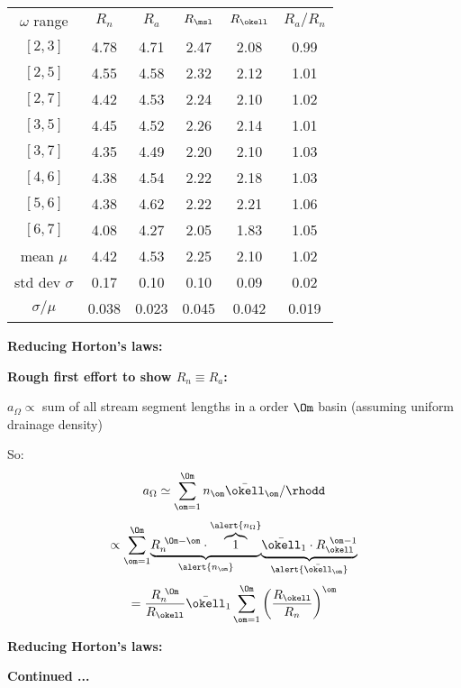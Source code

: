 \begin{frame}[label=]
\begin{frame}[label=]
\begin{frame}[label=]
\begin{frame}[label=]
\begin{frame}[label=]
\begin{frame}[label=]
\begin{frame}[label=]
\begin{frame}[label=]
\begin{frame}[label=]
\begin{frame}[label=]
\begin{frame}[label=]
\begin{frame}[label=]
\begin{frame}[label=]
\begin{frame}[label=]
\begin{frame}[label=]
   \begin{tabular}{cccccc}
     $\omega$ range & $R_n$ & $R_a$ & $R_\msl$ & $R_{\okell}$ & $R_a/R_n$ \\
     $[2,3]$ & 4.78 & 4.71 & 2.47 & 2.08 & 0.99 \\
     $[2,5]$ & 4.55 & 4.58 & 2.32 & 2.12 & 1.01 \\
     $[2,7]$ & 4.42 & 4.53 & 2.24 & 2.10 & 1.02 \\
     $[3,5]$ & 4.45 & 4.52 & 2.26 & 2.14 & 1.01 \\
     $[3,7]$ & 4.35 & 4.49 & 2.20 & 2.10 & 1.03 \\
     $[4,6]$ & 4.38 & 4.54 & 2.22 & 2.18 & 1.03 \\
     $[5,6]$ & 4.38 & 4.62 & 2.22 & 2.21 & 1.06 \\
     $[6,7]$ & 4.08 & 4.27 & 2.05 & 1.83 & 1.05 \\
     mean $\mu$ & 4.42 & 4.53 & 2.25 & 2.10 & 1.02 \\
     std dev $\sigma$ & 0.17 &  0.10 & 0.10 & 0.09 & 0.02 \\
     $\sigma/\mu$ & 0.038 &  0.023 & 0.045 & 0.042 & 0.019 \\
   \end{tabular}


\begin{frame}[label=]
  \textbf{Reducing Horton's laws:}
  
  \textbf{Rough first effort to show $R_n \equiv R_a$:}
    
     
      $a_\Omega \propto$ sum of all stream segment lengths in a order $\Om$ basin
      (assuming uniform drainage density)
    
      So:
      $$ a_\Omega \simeq \sum_{\om=1}^{\Om} n_\om \bar{\okell}_\om/\rhodd $$
      $$
      {
        \propto \sum_{\om=1}^{\Om}
       } 
       {
         \underbrace{R_n^{\ \Om-\om} \cdot \overbrace{1}^{\alert{n_\Omega}}}_{\alert{n_\om}}
       }
       {
         \underbrace{\bar{\okell}_1 \cdot R_\okell^{\ \om-1}}_{\alert{\bar{\okell}_\om}}
       }
       $$
     {
       $$
       = 
       \frac{R_n^{\ \Om}}{R_\okell} \bar{\okell}_1
       \sum_{\om=1}^{\Om} 
       \left(
       \frac{R_\okell}{R_n}
       \right)^\om
       $$
       }
    
  

\begin{frame}[label=]
  \textbf{Reducing Horton's laws:}

  \textbf{Continued ...}
    

\end{frame}
\end{frame}
\end{frame}
\end{frame}
\end{frame}
\end{frame}
\end{frame}
\end{frame}
\end{frame}
\end{frame}
\end{frame}
\end{frame}
\end{frame}
\end{frame}
\end{frame}
\end{frame}
\end{frame}
